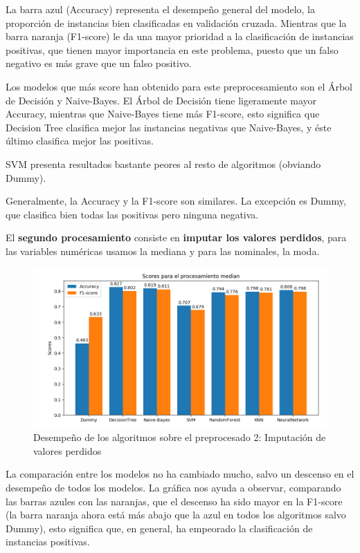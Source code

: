 \documentclass[oneside]{book}
\begin{document}
La barra azul (Accuracy) representa el desempeño general del modelo,
la proporción de instancias bien clasificadas en validación
cruzada. Mientras que la barra naranja (F1-score) le da una mayor
prioridad a la clasificación de instancias positivas, que tienen mayor
importancia en este problema, puesto que un falso negativo es más
grave que un falso positivo.

Los modelos que más score han obtenido para este preprocesamiento son
el Árbol de Decisión y Naive-Bayes. El Árbol de Decisión tiene
ligeramente mayor Accuracy, mientras que Naive-Bayes tiene más
F1-score, esto significa que Decision Tree clasifica mejor las
instancias negativas que Naive-Bayes, y éste último clasifica mejor
las positivas.

SVM presenta resultados bastante peores al resto de algoritmos
(obviando Dummy).

Generalmente, la Accuracy y la F1-score son similares. La excepción es
Dummy, que clasifica bien todas las positivas pero ninguna negativa.

El \textbf{segundo procesamiento} consiste en \textbf{imputar los
  valores perdidos}, para las variables numéricas usamos la mediana y
para las nominales, la moda.

\begin{figure}[H]
  \centering
  \caption{Desempeño de los algoritmos sobre el preprocesado 2: Imputación de valores perdidos}
  \label{fig:median}
  \includegraphics[width=170mm]{figures/visualizacion/median}
\end{figure}

La comparación entre los modelos no ha cambiado mucho, salvo un
descenso en el desempeño de todos los modelos. La gráfica nos ayuda a
observar, comparando las barras azules con las naranjas, que el
descenso ha sido mayor en la F1-score (la barra naranja ahora está más
abajo que la azul en todos los algoritmos salvo Dummy), esto significa
que, en general, ha empeorado la clasificación de instancias
positivas.
\end{document}
